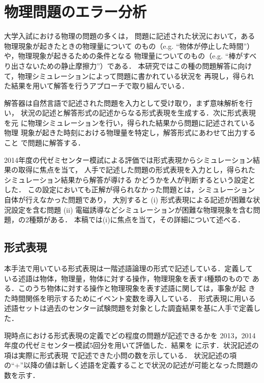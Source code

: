 \documentclass[japanese]{jnlp_1.4b}
\def\TABREF#1{}
\begin{document}
 \section{物理問題のエラー分析}

 大学入試における物理の問題の多くは，
 問題に記述された状況において，ある物理現象が起きたときの物理量について
 のもの（e.g. ``物体が停止した時間''）や，物理現象が起きるための条件となる
 物理量についてのもの（e.g. ``棒がすべり出さないための静止摩擦力''）である．
 本研究ではこの種の問題解答に向けて，物理シミュレーションによって問題に書かれている状況を
 再現し，得られた結果を用いて解答を行うアプローチで取り組んでいる\cite{yokno2014}．

 解答器は自然言語で記述された問題を入力として受け取り，まず意味解析を行い，
 状況の記述と解答形式の記述からなる形式表現を生成する．次に形式表現を元
 に物理シミュレーションを行い，得られた結果から問題に記述されている物理
 現象が起きた時刻における物理量を特定し，解答形式にあわせて出力すること
 で問題に解答する．

 2014年度の代ゼミセンター模試による評価では形式表現からシミュレーション結果の取得に焦点を当て，
 人手で記述した問題の形式表現を入力とし，得られたシミュレーション結果から解答が導ける
 かどうかを人が判断するという設定とした．
 この設定においても正解が得られなかった問題とは，シミュレーション自体が行えなかった問題であり，
 大別すると (i) 形式表現による記述が困難な状況設定を含む問題 
 (ii) 電磁誘導などシミュレーションが困難な物理現象を含む問題，の2種類がある．
 本稿では(i)に焦点を当て，その詳細について述べる．


\subsection{形式表現}

  本手法で用いている形式表現は一階述語論理の形式で記述している．定義して
  いる述語は物体，物理量，物体に対する操作，物理現象を表す4種類のもので
  ある．このうち物体に対する操作と物理現象を表す述語に関しては，事象が起
  きた時間関係を明示するためにイベント変数を導入している．
  形式表現に用いる述語セットは過去のセンター試験問題を対象とした調査結果を基に人手で定義した．

  現時点における形式表現の定義でどの程度の問題が記述できるかを
  2013，2014年度の代ゼミセンター模試5回分を用いて評価した．結果を
  \TABREF{fig:butsuri:mondaibunrui}に示す．状況記述の項は実際に形式表現
  で記述できた小問の数を示している．
  状況記述の項の``+''以降の値は新しく述語を定義することで状況の記述が可能となった問題の数を示す．
\end{document}
